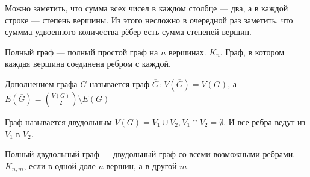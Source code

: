 Можно заметить, что сумма всех чисел в каждом столбце --- два, а в каждой строке --- степень вершины. Из этого несложно в очередной раз заметить, что суммма удвоенного количества рёбер есть сумма степеней вершин.

\begin{definition}
    Полный граф --- полный простой граф на $n$ вершинах.  $K_n$. Граф, в котором каждая вершина соединена ребром с каждой.
\end{definition}
\begin{definition}
    Дополнением графа $G$ называется граф  $\overline{G}$:  $V(\overline{G}) = V(G)$, а $E(\overline{G}) = \binom{V(G)}{2} \setminus E(G)$ 
\end{definition}

\begin{definition}
    Граф называется двудольным $V(G) = V_1 \cup V_2, V_1 \cap V_2 = \emptyset$. И все ребра ведут из $V_1$ в  $V_2$.
\end{definition}
\begin{definition}
    Полный двудольный граф --- двудольный граф со всеми возможными ребрами. $K_{n, m}$, если в одной доле $n$ вершин, а в другой  $m$.
\end{definition}

